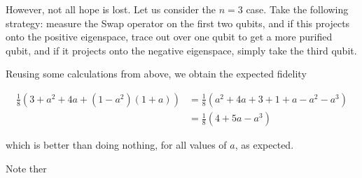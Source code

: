 \documentclass[a4paper]{article}
\newcommand\0{\mathbf{0}}
\def\Tr{\textrm{Tr}}
\newcommand{\bracketsub}[3]{\left\<{#1}\left|{#2}\right|{#3}\right\>}
\newcommand\<{\langle}
\renewcommand\>{\rangle}
\begin{document}
However, not all hope is lost. Let us consider the $n=3$ case. Take the following strategy: measure the Swap operator on the first two qubits, and if this projects onto the positive eigenspace, trace out over one qubit to get a more purified qubit, and if it projects onto the negative eigenspace, simply take the third qubit.

Reusing some calculations from above, we obtain the expected fidelity 

\begin{align*}
    \frac{1}{8}(3+a^2+4a + (1-a^2)(1+a)) &= \frac{1}{8}(a^2+4a+3 + 1+a-a^2-a^3) \\
    &= \frac{1}{8}(4+5a-a^3)
\end{align*}

which is better than doing nothing, for all values of $a$, as expected. 

Note ther


\begin{comment}

But first, let's optimize our earlier calculation. We had \begin{align*}
    \frac{1}{2}(1+\Tr(\rho^2))\cdot \frac{1}{2}(1+ \frac{\bracketsub{1}{\rho+\rho^2}{1}}{1+\Tr(\rho^2)}) + \frac{1}{2}(1-\Tr(\rho^2))\cdot\frac{1}{2}  &= \frac{1}{4}(1+\Tr(\rho^2) + \bracketsub{1}{\rho+\rho^2}{1} + 1-\Tr(\rho^2)) \\
    &= \frac{1}{4}(2+\bracketsub{1}{\rho+\rho^2}{1})
\end{align*}

and this agrees with our earlier calculation since $\bracketsub{1}{\rho+\rho^2}{1} = \bracketsub{1}{\rho}{1}+\bracketsub{1}{\rho^2}{1} = \frac{1}{2}(1+a) + (a + \frac{1}{4}(1-a)^2) = $

\end{comment}
\end{document}

